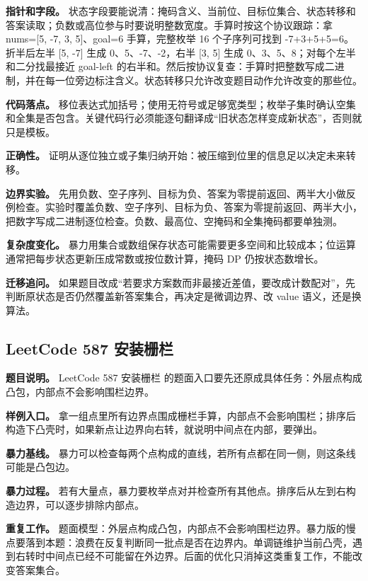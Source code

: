 \textbf{指针和字段。} 状态字段要能说清：掩码含义、当前位、目标位集合、状态转移和答案读取；负数或高位参与时要说明整数宽度。手算时按这个协议跟踪：拿 nums=[5, -7, 3, 5]、goal=6 手算，完整枚举 16 个子序列可找到 -7+3+5+5=6。折半后左半 [5, -7] 生成 0、5、-7、-2，右半 [3, 5] 生成 0、3、5、8；对每个左半和二分找最接近 goal-left 的右半和。然后按协议复查：手算时把整数写成二进制，并在每一位旁边标注含义。状态转移只允许改变题目动作允许改变的那些位。

\textbf{代码落点。} 移位表达式加括号；使用无符号或足够宽类型；枚举子集时确认空集和全集是否包含。关键代码行必须能逐句翻译成“旧状态怎样变成新状态”，否则就只是模板。

\textbf{正确性。} 证明从逐位独立或子集归纳开始：被压缩到位里的信息足以决定未来转移。

\textbf{边界实验。} 先用负数、空子序列、目标为负、答案为零提前返回、两半大小做反例检查。实验时覆盖负数、空子序列、目标为负、答案为零提前返回、两半大小，把数字写成二进制逐位检查。负数、最高位、空掩码和全集掩码都要单独测。

\textbf{复杂度变化。} 暴力用集合或数组保存状态可能需要更多空间和比较成本；位运算通常把每步状态更新压成常数或按位数计算，掩码 DP 仍按状态数增长。

\textbf{迁移追问。} 如果题目改成“若要求方案数而非最接近差值，要改成计数配对”，先判断原状态是否仍然覆盖新答案集合，再决定是微调边界、改 value 语义，还是换算法。

\subsection{LeetCode 587 安装栅栏}

\textbf{题目说明。} LeetCode 587 安装栅栏 的题面入口要先还原成具体任务：外层点构成凸包，内部点不会影响围栏边界。

\textbf{样例入口。} 拿一组点里所有边界点围成栅栏手算，内部点不会影响围栏；排序后构造下凸壳时，如果新点让边界向右转，就说明中间点在内部，要弹出。

\textbf{暴力基线。} 暴力可以检查每两个点构成的直线，若所有点都在同一侧，则这条线可能是凸包边。

\textbf{暴力过程。} 若有大量点，暴力要枚举点对并检查所有其他点。排序后从左到右构造边界，可以逐步排除内部点。

\textbf{重复工作。} 题面模型：外层点构成凸包，内部点不会影响围栏边界。暴力版的慢点要落到本题：浪费在反复判断同一批点是否在边界内。单调链维护当前凸壳，遇到右转时中间点已经不可能留在外边界。后面的优化只消掉这类重复工作，不能改变答案集合。

